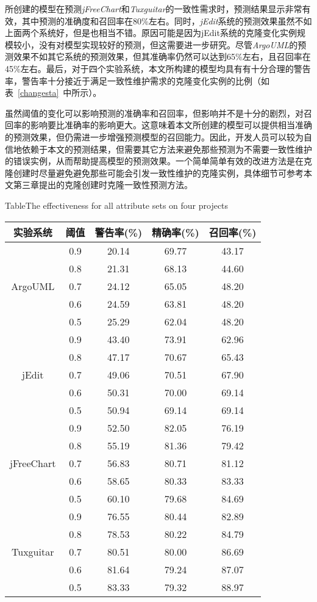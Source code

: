 所创建的模型在预测{\em jFreeChart}和{\em Tuxguitar}的一致性需求时，预测结果显示非常有效，其中预测的准确度和召回率在80\%左右。同时，{\em jEdit}系统的预测效果虽然不如上面两个系统好，但是也相当不错。原因可能是因为jEdit系统的克隆变化实例规模较小，没有对模型实现较好的预测，但这需要进一步研究。尽管{\em  ArgoUML}的预测效果不如其它系统的预测效果，但其准确率仍然可以达到65\%左右，且召回率在45\%左右。最后，对于四个实验系统，本文所构建的模型均具有有十分合理的警告率，警告率十分接近于满足一致性维护需求的克隆变化实例的比例（如表~\ref {changesta}~中所示）。

虽然阈值的变化可以影响预测的准确率和召回率，但影响并不是十分的剧烈，对召回率的影响要比准确率的影响更大。这意味着本文所创建的模型可以提供相当准确的预测效果，但仍需进一步增强预测模型的召回能力。因此，开发人员可以较为自信地依赖于本文的预测结果，但需要其它方法来避免那些预测为不需要一致性维护的错误实例，从而帮助提高模型的预测效果。一个简单简单有效的改进方法是在克隆创建时尽量避免避免那些可能会引发一致性维护的克隆实例，具体细节可参考本文第三章提出的克隆创建时克隆一致性预测方法。

\begin{table}[htbp]
{Table$\!$}{The effectiveness for all attribute sets on four projects}
\vspace{0.5em}
\centering
\wuhao
\begin{tabular}{ccccc}
\toprule[1.5pt]
{实验系统}&{阈值}&{警告率(\%)}&{精确率(\%)}&{召回率(\%)}\\
\midrule[1pt]
 \multirow{5}{*}{ArgoUML}
&0.9&	20.14&	69.77&	43.17\\
&0.8&	21.31&	68.13&	44.60\\
&0.7&	24.12&	65.05&	48.20\\
&0.6&	24.59&	63.81&	48.20\\
&0.5&	25.29&	62.04&	48.20\\
\hline
\multirow{5}{*}{jEdit}
&0.9&	43.40&	73.91&	62.96\\
&0.8&	47.17&	70.67&	65.43\\
&0.7&	49.06&	70.51&	67.90\\
&0.6&	50.31&	70.00&	69.14\\
&0.5&	50.94&	69.14&	69.14\\
\hline
\multirow{5}{*}{jFreeChart}
&0.9&	52.50&	82.05&	76.19\\
&0.8&	55.19&	81.36&	79.42\\
&0.7&	56.83&	80.71&	81.12\\
&0.6&	58.65&	80.33&	83.33\\
&0.5&	60.10&	79.68&	84.69\\
\hline
\multirow{5}{*}{Tuxguitar}
&0.9	&76.55&   80.44&	82.89\\
&0.8	&78.53&	80.22&	84.79\\
&0.7	&80.51&	80.00&	86.69\\
&0.6	&81.64&	79.24&	87.07\\
&0.5    &83.33&	79.32&	88.97\\
\bottomrule[1.5pt]
\end{tabular}
\end{table}

